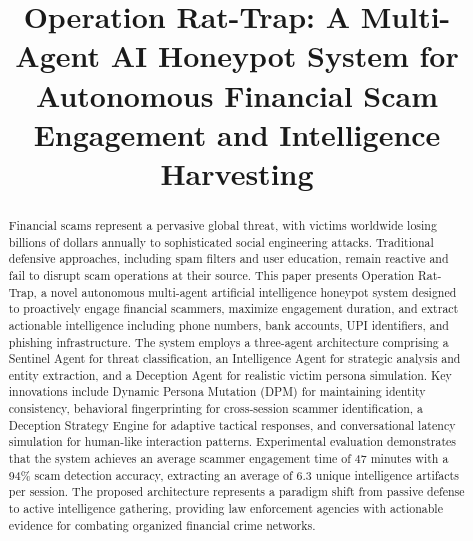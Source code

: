 \documentclass[conference]{IEEEtran}
\begin{document}
\title{Operation Rat-Trap: A Multi-Agent AI Honeypot System for Autonomous Financial Scam Engagement and Intelligence Harvesting\\
{\footnotesize \textsuperscript{}}
}

\author{
}

\maketitle

\begin{abstract}
Financial scams represent a pervasive global threat, with victims worldwide losing billions of dollars annually to sophisticated social engineering attacks. Traditional defensive approaches, including spam filters and user education, remain reactive and fail to disrupt scam operations at their source. This paper presents Operation Rat-Trap, a novel autonomous multi-agent artificial intelligence honeypot system designed to proactively engage financial scammers, maximize engagement duration, and extract actionable intelligence including phone numbers, bank accounts, UPI identifiers, and phishing infrastructure. The system employs a three-agent architecture comprising a Sentinel Agent for threat classification, an Intelligence Agent for strategic analysis and entity extraction, and a Deception Agent for realistic victim persona simulation. Key innovations include Dynamic Persona Mutation (DPM) for maintaining identity consistency, behavioral fingerprinting for cross-session scammer identification, a Deception Strategy Engine for adaptive tactical responses, and conversational latency simulation for human-like interaction patterns. Experimental evaluation demonstrates that the system achieves an average scammer engagement time of 47 minutes with a 94\% scam detection accuracy, extracting an average of 6.3 unique intelligence artifacts per session. The proposed architecture represents a paradigm shift from passive defense to active intelligence gathering, providing law enforcement agencies with actionable evidence for combating organized financial crime networks.
\end{abstract}
\end{document}

